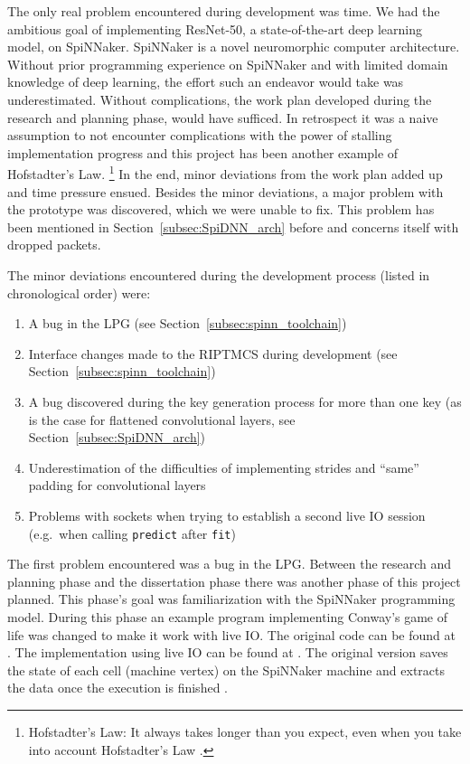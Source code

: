 \documentclass[]{article}
\begin{document}
The only real problem encountered during development was time.
We had the ambitious goal of implementing ResNet-50, a
state-of-the-art deep learning model, on SpiNNaker.
SpiNNaker is a novel neuromorphic computer architecture.
Without prior programming experience on SpiNNaker and with limited
domain knowledge of deep learning, the effort such an endeavor would
take was underestimated.
Without complications, the work plan developed during the research and
planning phase, would have sufficed.
In retrospect it was a naive assumption to not encounter
complications with the power of stalling implementation progress
and this project has been another example of Hofstadter's Law.%
\footnote{%
  Hofstadter's Law: It always takes longer than you expect, even when
  you take into account Hofstadter's Law \citep{hofstadter_1979}.
}
In the end, minor deviations from the work plan added up and time
pressure ensued.
Besides the minor deviations, a major problem with the prototype was
discovered, which we were unable to fix.
This problem has been mentioned in Section~\ref{subsec:SpiDNN_arch}
before and concerns itself with dropped packets.

The minor deviations encountered during the development process
(listed in chronological order) were:

\begin{enumerate}
  \item A bug in the LPG (see Section~\ref{subsec:spinn_toolchain})
  \item Interface changes made to the RIPTMCS during development (see
    Section~\ref{subsec:spinn_toolchain})
  \item A bug discovered during the key generation process for more
    than one key (as is the case for flattened convolutional layers,
    see Section~\ref{subsec:SpiDNN_arch})
  \item Underestimation of the difficulties of implementing strides
    and ``same'' padding for convolutional layers
  \item Problems with sockets when trying to establish a second live
    IO session (e.g.\ when calling \texttt{predict} after
    \texttt{fit})
\end{enumerate}

The first problem encountered was a bug in the LPG.
Between the research and planning phase and the dissertation phase
there was another phase of this project planned.
This phase's goal was familiarization with the SpiNNaker programming
model.
During this phase an example program implementing Conway's game of
life \citep{gardener_1970, furber_et_al_2020} was changed to make it
work with live IO.
The original code can be found at \citet{spinnaker_2020b}.
The implementation using live IO can be found at
\citet{fassbender_2020}.
The original version saves the state of each cell (machine vertex)
on the SpiNNaker machine and extracts the data once the execution is
finished \citep{furber_et_al_2020, spinnaker_2020b}.
\end{document}
